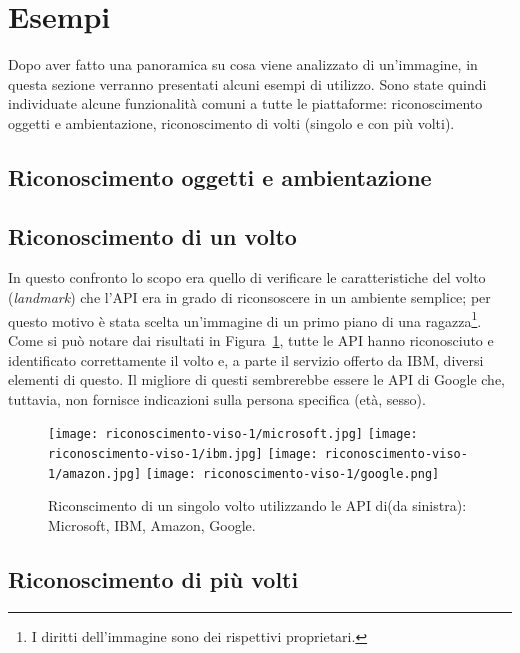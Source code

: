 
\section{Esempi}\label{sec:esempi}
Dopo aver fatto una panoramica su cosa viene analizzato di un'immagine, in questa sezione verranno presentati alcuni esempi di utilizzo.
Sono state quindi individuate alcune funzionalità comuni a tutte le piattaforme: riconoscimento oggetti e ambientazione, riconoscimento di volti (singolo e con più volti).
\subsection{Riconoscimento oggetti e ambientazione}\label{subsec:riconscimento-oggetti-ambientazione}
\subsection{Riconoscimento di un volto}\label{subsec:riconscimento-singolo-volto}
In questo confronto lo scopo era quello di verificare le caratteristiche del volto (\textit{landmark}) che l'API era in grado di riconsoscere in un ambiente semplice;
per questo motivo è stata scelta un'immagine di un primo piano di una ragazza\footnote{I diritti dell'immagine sono dei rispettivi proprietari.}.
Come si può notare dai risultati in Figura~\ref{fig:riconscimento-singolo-volto}, tutte le API hanno riconosciuto e identificato correttamente il volto e, a parte
il servizio offerto da IBM, diversi elementi di questo.
Il migliore di questi sembrerebbe essere le API di Google che, tuttavia, non fornisce indicazioni sulla persona specifica (età, sesso).
\begin{figure}[!h]
\begin{center}
	\texttt{[image: riconoscimento-viso-1/microsoft.jpg]}
	\texttt{[image: riconoscimento-viso-1/ibm.jpg]}
	\texttt{[image: riconoscimento-viso-1/amazon.jpg]}
	\texttt{[image: riconoscimento-viso-1/google.png]}
{\scriptsize \caption{Riconscimento di un singolo volto utilizzando le API di(da sinistra): Microsoft, IBM, Amazon, Google.}
\label{fig:riconscimento-singolo-volto}}
\end{center}
\end{figure}
%
\subsection{Riconoscimento di più volti}\label{subsec:riconscimento-piu-volti}
%
